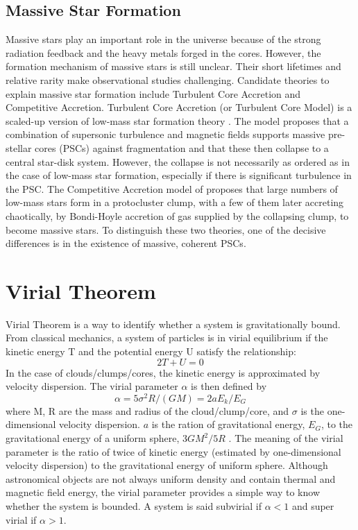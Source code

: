 \subsection{Massive Star Formation}
Massive stars play an important role in the universe because of the strong radiation feedback and the heavy metals forged in the cores. However, the formation mechanism of massive stars is still unclear. Their short lifetimes and relative rarity make observational studies challenging. Candidate theories to explain massive star formation include Turbulent Core Accretion and Competitive Accretion. Turbulent Core Accretion (or Turbulent Core Model) \cite{Mckee2003a} is a scaled-up version of low-mass star formation theory \cite{Shu1987}. The model proposes that a combination of supersonic turbulence and magnetic fields supports massive pre-stellar cores (PSCs) against fragmentation and that these then collapse to a central star-disk system. However, the collapse is not necessarily as ordered as in the case of low-mass star formation, especially if there is significant turbulence in the PSC. The Competitive Accretion model of \cite{Bonnell2001} proposes that large numbers of low-mass stars form in a protocluster clump, with a few of them later accreting chaotically, by Bondi-Hoyle accretion of gas supplied by the collapsing clump, to become massive stars. To distinguish these two theories, one of the decisive differences is in the existence of massive, coherent PSCs.

\section{Virial Theorem}
Virial Theorem is a way to identify whether a system is gravitationally bound. From classical mechanics, a system of particles is in virial equilibrium if the kinetic energy T and the potential energy U satisfy the relationship:
\begin{equation}
    2T + U = 0
\end{equation}
In the case of clouds/clumps/cores, the kinetic energy is approximated by velocity dispersion. The virial parameter $\alpha$ is then defined by
\begin{equation}
    \alpha = 5 \sigma^2 R / (GM) = 2a E_k/E_G
\end{equation}
where M, R are the mass and radius of the cloud/clump/core, and $\sigma$ is the one-dimensional velocity dispersion. $a$ is the ration of gravitational energy, $E_G$, to the gravitational energy of a uniform sphere, $3GM^2/5R$ \cite{Bertoldi1992}. The meaning of the virial parameter is the ratio of twice of kinetic energy (estimated by one-dimensional velocity dispersion) to the gravitational energy of uniform sphere. Although astronomical objects are not always uniform density and contain thermal and magnetic field energy, the virial parameter provides a simple way to know whether the system is bounded. A system is said subvirial if $\alpha < 1$ and super virial if $\alpha > 1$.


